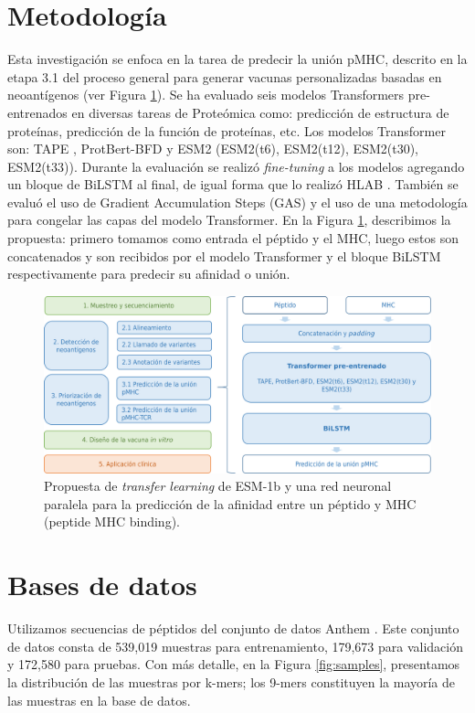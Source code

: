 \section{Metodología}

Esta investigación se  enfoca en la tarea de predecir la unión pMHC, descrito en la etapa 3.1 del proceso general para generar vacunas personalizadas basadas en neoantígenos (ver Figura \ref{fig:proposal}). Se ha evaluado  seis modelos Transformers pre-entrenados en diversas tareas de Proteómica como: predicción de estructura de proteínas, predicción de la función de proteínas, etc. Los modelos Transformer son: TAPE \citep{rao2019evaluating}, ProtBert-BFD \citep{elnaggar2021prottrans} y ESM2 \citep{lin2023evolutionary} (ESM2(t6), ESM2(t12), ESM2(t30), ESM2(t33)). Durante la evaluación se realizó \textit{fine-tuning} a los modelos agregando un bloque de BiLSTM al final, de igual forma que lo realizó HLAB \citep{zhang2022hlab}. También se evaluó el uso de Gradient Accumulation Steps (GAS) y el uso de una metodología para congelar las capas del modelo Transformer. En la Figura \ref{fig:proposal}, describimos la propuesta: primero tomamos como entrada el péptido y el MHC, luego estos son concatenados y son recibidos por el modelo Transformer y el bloque BiLSTM respectivamente para predecir su afinidad o unión.




\begin{figure}[H]
	\centering
	\includegraphics[width=\textwidth]{img/proposal/proposal}	
	\caption{Propuesta de \textit{transfer learning} de ESM-1b y una red neuronal paralela para la predicción de la afinidad entre un péptido y MHC (peptide MHC binding).}
	\label{fig:proposal}
\end{figure}


\section{Bases de datos}
Utilizamos secuencias de péptidos del conjunto de datos Anthem \citep{mei2021anthem}. Este conjunto de datos consta de 539,019 muestras para entrenamiento, 179,673 para validación y 172,580 para pruebas. Con más detalle, en la Figura \ref{fig:samples}, presentamos la distribución de las muestras por k-mers; los 9-mers constituyen la mayoría de las muestras en la base de datos.

